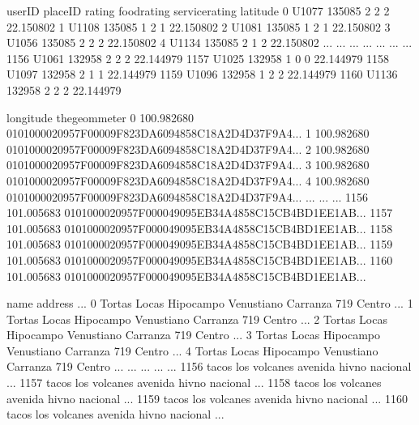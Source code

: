 \documentclass[letterpaper,10pt,english]{jupyterBook}
\begin{document}
\begin{sphinxVerbatim}[commandchars=\\\{\}]
     userID  placeID  rating  food\PYGZus{}rating  service\PYGZus{}rating   latitude  \PYGZbs{}
0     U1077   135085       2            2               2  22.150802   
1     U1108   135085       1            2               1  22.150802   
2     U1081   135085       1            2               1  22.150802   
3     U1056   135085       2            2               2  22.150802   
4     U1134   135085       2            1               2  22.150802   
...     ...      ...     ...          ...             ...        ...   
1156  U1061   132958       2            2               2  22.144979   
1157  U1025   132958       1            0               0  22.144979   
1158  U1097   132958       2            1               1  22.144979   
1159  U1096   132958       1            2               2  22.144979   
1160  U1136   132958       2            2               2  22.144979   

       longitude                                     the\PYGZus{}geom\PYGZus{}meter  \PYGZbs{}
0    \PYGZhy{}100.982680  0101000020957F00009F823DA6094858C18A2D4D37F9A4...   
1    \PYGZhy{}100.982680  0101000020957F00009F823DA6094858C18A2D4D37F9A4...   
2    \PYGZhy{}100.982680  0101000020957F00009F823DA6094858C18A2D4D37F9A4...   
3    \PYGZhy{}100.982680  0101000020957F00009F823DA6094858C18A2D4D37F9A4...   
4    \PYGZhy{}100.982680  0101000020957F00009F823DA6094858C18A2D4D37F9A4...   
...          ...                                                ...   
1156 \PYGZhy{}101.005683  0101000020957F000049095EB34A4858C15CB4BD1EE1AB...   
1157 \PYGZhy{}101.005683  0101000020957F000049095EB34A4858C15CB4BD1EE1AB...   
1158 \PYGZhy{}101.005683  0101000020957F000049095EB34A4858C15CB4BD1EE1AB...   
1159 \PYGZhy{}101.005683  0101000020957F000049095EB34A4858C15CB4BD1EE1AB...   
1160 \PYGZhy{}101.005683  0101000020957F000049095EB34A4858C15CB4BD1EE1AB...   

                        name                         address  ...  \PYGZbs{}
0     Tortas Locas Hipocampo  Venustiano Carranza 719 Centro  ...   
1     Tortas Locas Hipocampo  Venustiano Carranza 719 Centro  ...   
2     Tortas Locas Hipocampo  Venustiano Carranza 719 Centro  ...   
3     Tortas Locas Hipocampo  Venustiano Carranza 719 Centro  ...   
4     Tortas Locas Hipocampo  Venustiano Carranza 719 Centro  ...   
...                      ...                             ...  ...   
1156      tacos los volcanes          avenida hivno nacional  ...   
1157      tacos los volcanes          avenida hivno nacional  ...   
1158      tacos los volcanes          avenida hivno nacional  ...   
1159      tacos los volcanes          avenida hivno nacional  ...   
1160      tacos los volcanes          avenida hivno nacional  ...   


\end{sphinxVerbatim}
\end{document}
